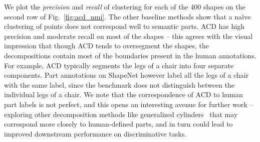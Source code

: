 We plot the \textit{precision} and \textit{recall} of clustering for each of the 400 shapes on the second row of
Fig.~\ref{fig:acd_nmi}. 
The other baseline methods show that a na\"ive clustering of points does not correspond well to semantic
parts. 
ACD has high precision and moderate recall on most of the shapes -- this agrees with the visual impression
that though ACD tends to oversegment the shapes, the decompositions contain most of the boundaries present
in the human annotations.
For example, ACD typically segments the legs of a chair into four separate components. Part annotations on
ShapeNet however label all the legs of a chair with the same label, since the benchmark does not
distinguish between the individual legs of a chair.
We note that the correspondence of ACD to human part labels is not perfect, and this opens an interesting
avenue for further work -- exploring other decomposition methods like generalized cylinders~\cite{gdc}
that may correspond more closely to human-defined parts, and in turn could lead to improved downstream
performance on discriminative tasks.



